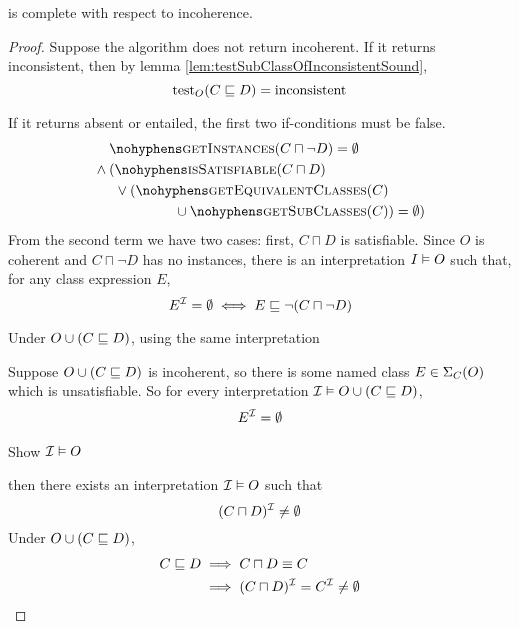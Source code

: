 \documentclass[paper.tex]{subfiles}
\begin{document}
\begin{lemma}
  \label{lem:testSubClassOfIncoherentComplete}
   is complete with respect to incoherence.
\end{lemma}
\begin{proof}
  Suppose the algorithm does not return incoherent.  If it returns inconsistent, then by lemma \ref{lem:testSubClassOfInconsistentSound},
  \[ \operatorname{test}_O(C \sqsubseteq D) = \mathrm{inconsistent} \]

  If it returns absent or entailed, the first two if-conditions must be false.
  \begin{align*}
    & \textproc{getInstances}(C \sqcap \neg D) = \emptyset \\
    {}\land{}& \begin{aligned}[t]
      (& \textproc{isSatisfiable}(C \sqcap D) \\
      & \lor \begin{aligned}[t]
        (\textproc{getEquivalentClasses}(C)& \\
        {} \union \textproc{getSubClasses}(C)&) = \emptyset)
      \end{aligned}
    \end{aligned}
  \end{align*}
  From the second term we have two cases: first, $C \sqcap D$ is satisfiable.  Since $O$ is coherent and $C \sqcap \neg D$ has no instances, there is an interpretation $I \vDash O$ such that, for any class expression $E$,
  \[ E^{\mathcal{I}} = \emptyset \iff E \sqsubseteq \neg (C \sqcap \neg D) \]


  Under $O \cup (C \sqsubseteq D)$, using the same interpretation

  Suppose $O \cup (C \sqsubseteq D)$ is incoherent, so there is some named class $E \in \Sigma_C(O)$ which is unsatisfiable.  So for every interpretation $\mathcal{I} \vDash O \cup (C \sqsubseteq D)$,
  \begin{align*}
    E^{\mathcal{I}} = \emptyset
  \end{align*}

  \todo Show $\mathcal{I} \vDash O$

  then there exists an interpretation $\mathcal{I} \vDash O$ such that
  \[ (C \sqcap D)^{\mathcal{I}} \ne \emptyset \]
  Under $O \cup (C \sqsubseteq D)$,
  \begin{align*}
    C \sqsubseteq D \implies{}& C \sqcap D \equiv C \\
    \implies{}& (C \sqcap D)^{\mathcal{I}} = C^{\mathcal{I}} \ne \emptyset
  \end{align*}


\end{proof}
\end{document}
